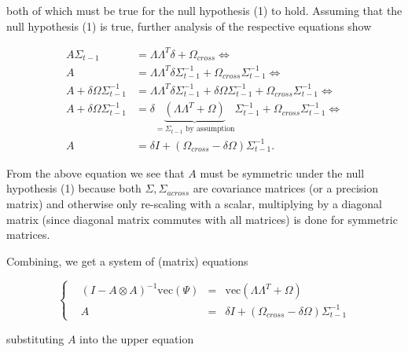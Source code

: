 \documentclass[
  letterpaper,
  DIV=11,
  numbers=noendperiod]{scrartcl}
\begin{document}
both of which must be true for the null hypothesis (1) to hold. Assuming
that the null hypothesis (1) is true, further analysis of the respective
equations show

\[
\begin{aligned}
A\Sigma_{t-1} &= \Lambda\Lambda^T\delta+\Omega_{cross} \Leftrightarrow\\
A &= \Lambda\Lambda^T\delta \Sigma_{t-1}^{-1} + \Omega_{cross} \Sigma_{t-1}^{-1} \Leftrightarrow\\
A + \delta \Omega \Sigma_{t-1}^{-1} &= \Lambda\Lambda^T\delta \Sigma_{t-1}^{-1} + \delta \Omega \Sigma_{t-1}^{-1} + \Omega_{cross} \Sigma_{t-1}^{-1} \Leftrightarrow\\
A + \delta \Omega \Sigma_{t-1}^{-1} &= \delta \underbrace{(\Lambda\Lambda^T + \Omega)}_{=\Sigma_{t-1} \text{ by assumption}} \Sigma_{t-1}^{-1} + \Omega_{cross} \Sigma_{t-1}^{-1} \Leftrightarrow\\
A &= \delta I + (\Omega_{cross} - \delta \Omega)\Sigma_{t-1}^{-1}.
\end{aligned}
\]

From the above equation we see that \(A\) must be symmetric under the
null hypothesis (1) because both \(\Sigma,\Sigma_{across}\) are
covariance matrices (or a precision matrix) and otherwise only
re-scaling with a scalar, multiplying by a diagonal matrix (since
diagonal matrix commutes with all matrices) is done for symmetric
matrices.

Combining, we get a system of (matrix) equations

\[
\begin{cases}
&(I-A \otimes A)^{-1} \text{vec}(\Psi) &=& \text{vec}(\Lambda \Lambda^T + \Omega)\\
&A &=& \delta I + (\Omega_{cross} - \delta \Omega)\Sigma_{t-1}^{-1}
\end{cases}
\]

substituting \(A\) into the upper equation
\end{document}
